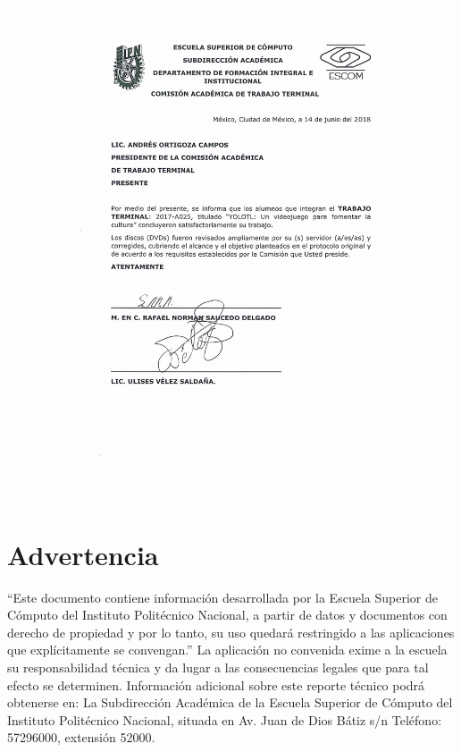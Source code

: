 \begin{figure}[H]
    \centering
    \includegraphics[width=1\textwidth]{imagen/compromiso.png}
\end{figure}

\chapter{Advertencia}

``Este documento contiene información desarrollada por la Escuela Superior de Cómputo del Instituto Politécnico Nacional, a partir de datos y documentos con derecho de propiedad y por lo tanto, su uso quedará restringido a las aplicaciones que explícitamente se convengan.”  La aplicación no convenida exime a la escuela su responsabilidad técnica y da lugar a las consecuencias legales que para tal efecto se determinen. Información adicional sobre este reporte técnico podrá obtenerse en: La Subdirección Académica de la Escuela Superior de Cómputo del Instituto Politécnico Nacional, situada en Av. Juan de Dios Bátiz s/n Teléfono: 57296000, extensión 52000.
